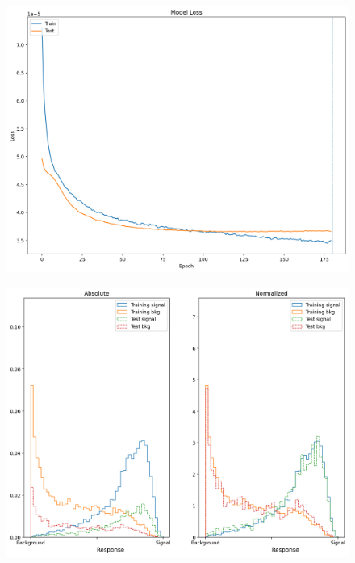 \documentclass{beamer}
\begin{document}
\begin{frame}
    \begin{columns}
        \begin{column}{0.5\textwidth}
            \begin{figure}
                \centering
                \includegraphics[width = \textwidth]{loss}
            \end{figure}
            \begin{figure}
                \centering
                \includegraphics[width = \textwidth]{Response}
            \end{figure}
        \end{column}

\end{columns}
\end{frame}
\end{document}

